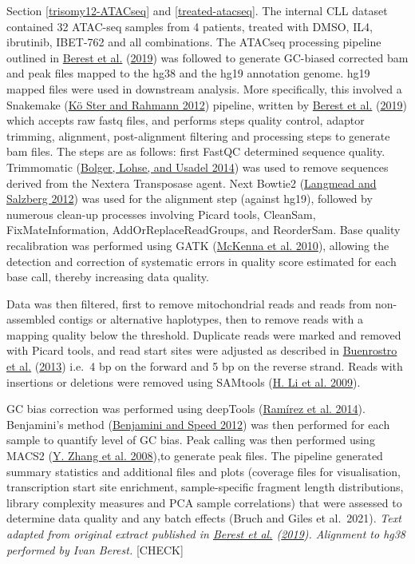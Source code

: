 \documentclass[11pt, a4paper, twosided]{book}
\begin{document}
Section \ref{trisomy12-ATACseq} and \ref{treated-atacseq}. The internal CLL dataset contained 32 ATAC-seq samples from 4 patients, treated with DMSO, IL4, ibrutinib, IBET-762 and all combinations. The ATACseq processing pipeline outlined in \protect\hyperlink{ref-Berest2019}{Berest et al.} (\protect\hyperlink{ref-Berest2019}{2019}) was followed to generate GC-biased corrected bam and peak files mapped to the hg38 and the hg19 annotation genome. hg19 mapped files were used in downstream analysis. More specifically, this involved a Snakemake (\protect\hyperlink{ref-Snakemake}{Kö Ster and Rahmann 2012}) pipeline, written by \protect\hyperlink{ref-Berest2019}{Berest et al.} (\protect\hyperlink{ref-Berest2019}{2019}) which accepts raw fastq files, and performs steps quality control, adaptor trimming, alignment, post-alignment filtering and processing steps to generate bam files. The steps are as follows: first FastQC determined sequence quality. Trimmomatic (\protect\hyperlink{ref-Trimmomatic}{Bolger, Lohse, and Usadel 2014}) was used to remove sequences derived from the Nextera Transposase agent. Next Bowtie2 (\protect\hyperlink{ref-Bowtie2}{Langmead and Salzberg 2012}) was used for the alignment step (against hg19), followed by numerous clean-up processes involving Picard tools, CleanSam, FixMateInformation, AddOrReplaceReadGroups, and ReorderSam. Base quality recalibration was performed using GATK (\protect\hyperlink{ref-GATK}{McKenna et al. 2010}), allowing the detection and correction of systematic errors in quality score estimated for each base call, thereby increasing data quality.

Data was then filtered, first to remove mitochondrial reads and reads from non-assembled contigs or alternative haplotypes, then to remove reads with a mapping quality below the threshold. Duplicate reads were marked and removed with Picard tools, and read start sites were adjusted as described in \protect\hyperlink{ref-Buenrostro2013}{Buenrostro et al.} (\protect\hyperlink{ref-Buenrostro2013}{2013}) i.e.~4 bp on the forward and 5 bp on the reverse strand. Reads with insertions or deletions were removed using SAMtools (\protect\hyperlink{ref-Samtools}{H. Li et al. 2009}).

GC bias correction was performed using deepTools (\protect\hyperlink{ref-deepTools}{Ramírez et al. 2014}). Benjamini's method (\protect\hyperlink{ref-Benjamini2012}{Benjamini and Speed 2012}) was then performed for each sample to quantify level of GC bias. Peak calling was then performed using MACS2 (\protect\hyperlink{ref-MACS2}{Y. Zhang et al. 2008}),to generate peak files. The pipeline generated summary statistics and additional files and plots (coverage files for visualisation, transcription start site enrichment, sample-specific fragment length distributions, library complexity measures and PCA sample correlations) that were assessed to determine data quality and any batch effects (Bruch and Giles et al.~2021). \emph{Text adapted from original extract published in \protect\hyperlink{ref-Berest2019}{Berest et al.} (\protect\hyperlink{ref-Berest2019}{2019}). Alignment to hg38 performed by Ivan Berest.} {[}CHECK{]}
\end{document}

